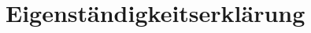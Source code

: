 \documentclass[../main.tex]{subfiles}
\begin{document}
\section{Eigenständigkeitserklärung}
\end{document}

